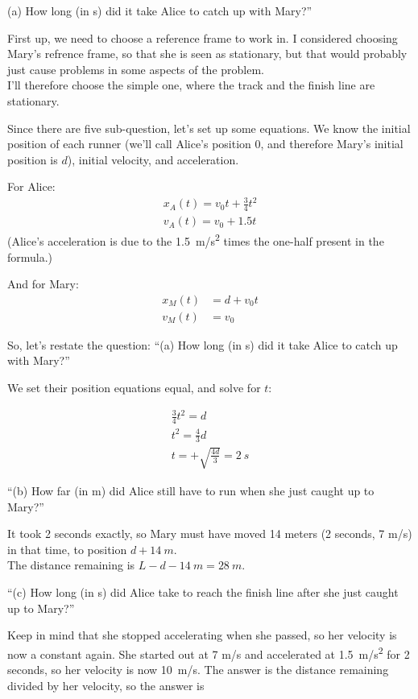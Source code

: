 \documentclass[12pt,a4paper]{report}
\begin{document}
(a) How long (in s) did it take Alice to catch up with Mary?''

First up, we need to choose a reference frame to work in. I considered choosing Mary's refrence frame, so that she is seen as stationary, but that would probably just cause problems in some aspects of the problem.\\
I'll therefore choose the simple one, where the track and the finish line are stationary.

Since there are five sub-question, let's set up some equations. We know the initial position of each runner (we'll call Alice's position 0, and therefore Mary's initial position is $d$), initial velocity, and acceleration.

For Alice:
\begin{align}
x_A(t) = v_0 t + \frac{3}{4} t^2\\
v_A(t) = v_0 + 1.5 t
\end{align}
(Alice's acceleration is due to the \SI{1.5}{m/s^2} times the one-half present in the formula.)

And for Mary:
\begin{align}
x_M(t) &= d + v_0 t\\
v_M(t) &= v_0
\end{align}

So, let's restate the question:
``(a) How long (in s) did it take Alice to catch up with Mary?''

We set their position equations equal, and solve for $t$:

\begin{align}
\frac{3}{4} t^2 = d\\
t^2 = \frac{4}{3} d\\
t = +\sqrt{\frac{4d}{3}} = \SI{2}{s}
\end{align}

``(b) How far (in m) did Alice still have to run when she just caught up to Mary?''

It took 2 seconds exactly, so Mary must have moved 14 meters (2 seconds, 7 m/s) in that time, to position $d + \SI{14}{m}$.\\
The distance remaining is $L - d - \SI{14}{m} = \SI{28}{m}$.

``(c) How long (in s) did Alice take to reach the finish line after she just caught up to Mary?''

Keep in mind that she stopped accelerating when she passed, so her velocity is now a constant again. She started out at 7 m/s and accelerated at \SI{1.5}{m/s^2} for 2 seconds, so her velocity is now \SI{10}{m/s}. The answer is the distance remaining divided by her velocity, so the answer is
\end{document}
